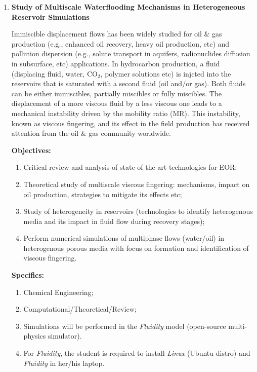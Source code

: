 \documentclass[12pts,a4paper,amsmath,amssymb,floatfix]{article}%
\begin{document}
\begin{enumerate}[label=\bfseries Project \arabic*:]
\clearpage

\item {\bf Study of Multiscale Waterflooding Mechanisms in Heterogeneous Reservoir Simulations}

Immiscible displacement flows has been widely studied for oil $\&$ gas production (e.g., enhanced oil recovery, heavy oil production, etc) and pollution dispersion (e.g., solute transport in aquifers, radionuclides diffusion in subsurface, etc) applications. In hydrocarbon production, a fluid (displacing fluid, water, CO$_{2}$, polymer solutions etc) is injcted into the reservoirs that is saturated with a second fluid (oil and/or gas). Both fluids can be either immiscibles, partially miscibles or fully miscibles. The displacement of a more viscous fluid by a less viscous one leads to a mechanical instability driven by the mobility ratio (MR). This instability, known as viscous fingering, and its effect in the field production has received attention from the oil $\&$ gas community worldwide.

\noindent
{\bf Objectives:}
\begin{enumerate}
\item Critical review and analysis of state-of-the-art technologies for EOR;
\item Theoretical study of multiscale viscous fingering: mechanisms, impact on oil production, strategies to mitigate its effects etc;
\item Study of heterogeneity in reservoirs (technologies to identify heterogenous media and its impact in fluid flow during recovery stages);
\item Perform numerical simulations of multiphase flows (water/oil) in heterogenous porous media with focus on formation and identification of viscous fingering.  
\end{enumerate}

\noindent
{\bf Specifics:} 
\begin{enumerate}
\item Chemical Engineering;
\item Computational/Theoretical/Review;
\item Simulations will be performed in the {\it Fluidity} model (open-source multi-physics simulator). 
\item For {\it Fluidity}, the student is required to install {\it Linux} (Ubuntu distro) and {\it Fluidity} in her/his laptop. 
\end{enumerate}



\end{enumerate}
\end{document}
